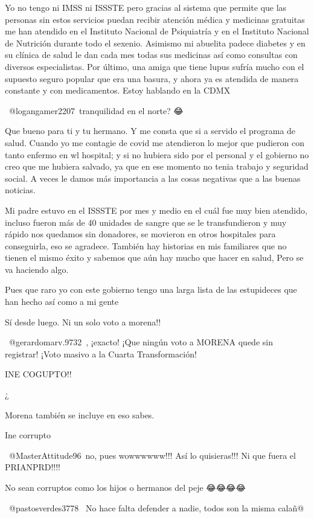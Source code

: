 Yo no tengo ni IMSS ni ISSSTE pero gracias al sistema que permite que las personas sin estos servicios puedan recibir atención médica y medicinas gratuitas me han atendido en el Instituto Nacional de Psiquiatría y en el Instituto Nacional de Nutrición durante todo el sexenio. Asimismo mi abuelita padece diabetes y en su clínica de salud le dan cada mes todas sus medicinas así como consultas con diversos especialistas. Por último, una amiga que tiene lupus sufría mucho con el supuesto seguro popular que era una basura, y ahora ya es atendida de manera constante y con medicamentos. Estoy hablando en la CDMX

 @logangamer2207 tranquilidad en el norte? 😂

Que bueno para ti y tu hermano. Y me consta que si a servido el programa de salud. Cuando yo me contagie de covid me atendieron lo mejor que pudieron con tanto enfermo en wl hospital; y si no hubiera sido por el personal y el gobierno no creo que me hubiera salvado, ya que en ese momento no tenia trabajo y seguridad social. A veces le damos más importancia a las cosas negativas que a las buenas noticias.

Mi padre estuvo en el ISSSTE por mes y medio en el cuál fue muy bien atendido, incluso fueron más de 40 unidades de sangre que se le transfundieron y muy rápido nos quedamos sin donadores, se movieron en otros hospitales para conseguirla, eso se agradece. También hay historias en mis familiares que no tienen el mismo éxito y sabemos que aún hay mucho que hacer en salud, Pero se va haciendo algo.

Pues que raro yo con este gobierno tengo una larga lista de las estupideces que han hecho así como a mi gente

Sí desde luego.
Ni un solo voto a morena!!

 @gerardomarv.9732 , ¡exacto! ¡Que ningún voto a MORENA quede sin registrar! ¡Voto masivo a la Cuarta Transformación!

INE COGUPTO!!

¿

Morena también se incluye en eso sabes.

Ine corrupto

 @MasterAttitude96 no, pues wowwwwww!!! Así lo quisieras!!! Ni que fuera el PRIANPRD!!!!

No sean corruptos como los hijos o hermanos del peje 😂😂😂😂

 @pastosverdes3778  No hace falta defender a nadie, todos son la misma calañ@

